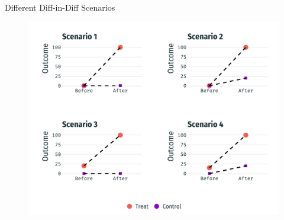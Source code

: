 \documentclass[usenames,dvipsnames,11pt,aspectratio=169]{beamer}
\begin{document}
\begin{frame}{Different Diff-in-Diff Scenarios}
\begin{figure}[!htb]
\centering
    \includegraphics[height=0.95\textheight]{figures/dd_keele.pdf}
\end{figure}
\end{frame}
\end{document}

